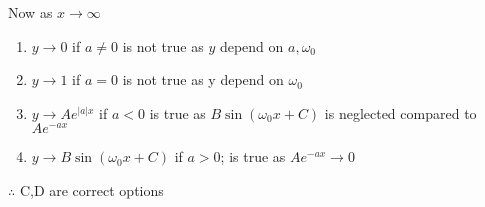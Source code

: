 \documentclass[journal,12pt,onecolumn]{IEEEtran}
\theoremstyle{remark}
\begin{document}
 Now as $x\to \infty$
 \begin{enumerate}
     \item $y \to 0$ if $a \neq 0$ is not true as $y$ depend on $a,\omega_0$
     \item $y \to 1 $ if $ a=0$ is not true as y depend on $\omega_0$
     \item $y \to Ae^{|a|x}$ if $a < 0$ is true as $ B\sin(\omega_0 x+C)$ is neglected compared to $A e^{-ax}$
     \item $y \to B \sin(\omega_0 x+C)$ if $a>0$; is true as $A e^{-ax} \to 0$ 
     
 \end{enumerate}
  $\therefore$ C,D are correct options
 
 
\end{document}
